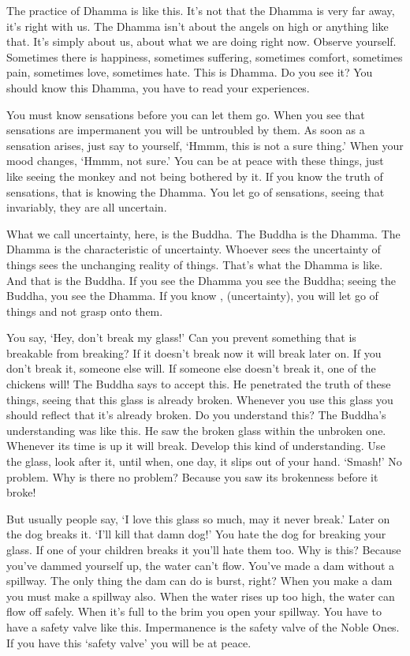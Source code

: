 The practice of Dhamma is like this. It's not that the Dhamma is very far away, it's right with us. The Dhamma isn't about the angels on high or anything like that. It's simply about us, about what we are doing right now. Observe yourself. Sometimes there is happiness, sometimes suffering, sometimes comfort, sometimes pain, sometimes love, sometimes hate. This is Dhamma. Do you see it? You should know this Dhamma, you have to read your experiences.

You must know sensations before you can let them go. When you see that sensations are impermanent you will be untroubled by them. As soon as a sensation arises, just say to yourself, `Hmmm, this is not a sure thing.' When your mood changes, `Hmmm, not sure.' You can be at peace with these things, just like seeing the monkey and not being bothered by it. If you know the truth of sensations, that is knowing the Dhamma. You let go of sensations, seeing that invariably, they are all uncertain.

What we call uncertainty, here, is the Buddha. The Buddha is the Dhamma. The Dhamma is the characteristic of uncertainty. Whoever sees the uncertainty of things sees the unchanging reality of things. That's what the Dhamma is like. And that is the Buddha. If you see the Dhamma you see the Buddha; seeing the Buddha, you see the Dhamma. If you know , (uncertainty), you will let go of things and not grasp onto them.

You say, `Hey, don't break my glass!' Can you prevent something that is breakable from breaking? If it doesn't break now it will break later on. If you don't break it, someone else will. If someone else doesn't break it, one of the chickens will! The Buddha says to accept this. He penetrated the truth of these things, seeing that this glass is already broken. Whenever you use this glass you should reflect that it's already broken. Do you understand this? The Buddha's understanding was like this. He saw the broken glass within the unbroken one. Whenever its time is up it will break. Develop this kind of understanding. Use the glass, look after it, until when, one day, it slips out of your hand. `Smash!' No problem. Why is there no problem? Because you saw its brokenness before it broke!

But usually people say, `I love this glass so much, may it never break.' Later on the dog breaks it. `I'll kill that damn dog!' You hate the dog for breaking your glass. If one of your children breaks it you'll hate them too. Why is this? Because you've dammed yourself up, the water can't flow. You've made a dam without a spillway. The only thing the dam can do is burst, right? When you make a dam you must make a spillway also. When the water rises up too high, the water can flow off safely. When it's full to the brim you open your spillway. You have to have a safety valve like this. Impermanence is the safety valve of the Noble Ones. If you have this `safety valve' you will be at peace.

